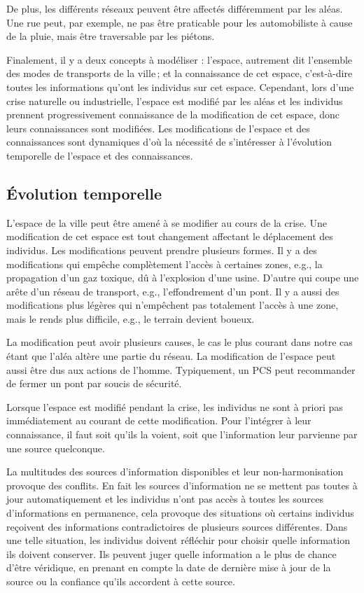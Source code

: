 \documentclass[a4paper]{article}
\begin{document}
De plus, les différents réseaux peuvent être affectés différemment par les
aléas. Une rue peut, par exemple, ne pas être praticable pour les automobiliste
à cause de la pluie, mais être traversable par les piétons.

Finalement, il y a deux concepts à modéliser : l'espace, autrement dit
l'ensemble des modes de transports de la ville\,; et la connaissance de cet
espace, c'est-à-dire toutes les informations qu'ont les individus sur cet
espace. Cependant, lors d'une crise naturelle ou industrielle, l'espace est
modifié par les aléas et les individus prennent progressivement connaissance
de la modification de cet espace, donc leurs connaissances sont modifiées. Les
modifications de l'espace et des connaissances sont dynamiques d'où la nécessité
de s'intéresser à l'évolution temporelle de l'espace et des connaissances.

\subsection{Évolution temporelle}

L'espace de la ville peut être amené à se modifier au cours de la crise. Une
modification de cet espace est tout changement affectant le déplacement des
individus. Les modifications peuvent prendre plusieurs formes. Il y a des
modifications qui empêche complètement l'accès à certaines zones, e.g., la
propagation d'un gaz toxique, dû à l'explosion d'une usine. D'autre qui coupe
une arête d'un réseau de transport, e.g., l'effondrement d'un pont. Il y a aussi
des modifications plus légères qui n'empêchent pas totalement l'accès à une
zone, mais le rends plus difficile, e.g., le terrain devient boueux.

La modification peut avoir plusieurs causes, le cas le plus courant dans notre
cas étant que l'aléa altère une partie du réseau. La modification de l'espace
peut aussi être dus aux actions de l'homme. Typiquement, un PCS peut
recommander de fermer un pont par soucis de sécurité.

Lorsque l'espace est modifié pendant la crise, les individus ne sont à priori
pas immédiatement au courant de cette modification. Pour l'intégrer à leur
connaissance, il faut soit qu'ils la voient, soit que l'information leur
parvienne par une source quelconque.

La multitudes des sources d'information disponibles et leur non-harmonisation
provoque des conflits. En fait les sources d'information ne se mettent pas
toutes à jour automatiquement et les individus n'ont pas accès à toutes les
sources d'informations en permanence, cela provoque des situations où certains
individus reçoivent des informations contradictoires de plusieurs sources
différentes. Dans une telle situation, les individus doivent réfléchir pour
choisir quelle information ils doivent conserver. Ils peuvent juger quelle
information a le plus de chance d'être véridique, en prenant en compte la date
de dernière mise à jour de la source ou la confiance qu'ils accordent à cette
source.
\end{document}
